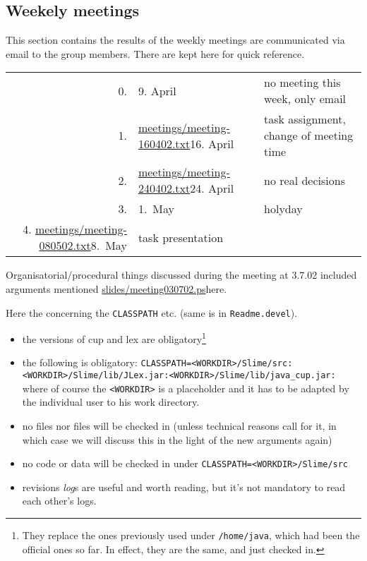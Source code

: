

\subsection*{Weekely meetings}
\label{sec:meetings}


This section contains the results of the weekly meetings are communicated
via email to the group members. There are kept here for quick reference.


\begin{center}
  \begin{tabular}[t]{r@{\quad}l@{\quad\quad}p{9cm}}
    0.
    &
    9. April
    &
    no meeting this week, only email
    \\
    1.
    &
    \url{meetings/meeting-160402.txt}{16. April}
    &
    task assignment, change of meeting time
    \\
    2.
    & 
    \url{meetings/meeting-240402.txt}{24. April}
    &
    no real decisions
    \\
    3.
    &
    1.\ May
    &
    holyday
    \\
    4.
    \url{meetings/meeting-080502.txt}{8.\ May}
    & 
    task presentation
    \\
  \end{tabular}
\end{center}



Organisatorial/procedural things discussed during the meeting at 3.7.02
included arguments mentioned \url{slides/meeting030702.ps}{here.}


Here the  concerning the \texttt{CLASSPATH}
etc. (same is in \texttt{Readme.devel}).

\begin{itemize}
\item the  versions of cup and lex are
  obligatory\footnote{They replace the ones previously used under
    \texttt{/home/java}, which had been the official ones so far. In
    effect, they are the same, and just checked in.}
\item the following  is obligatory:
  \texttt{CLASSPATH=<WORKDIR>/Slime/src:<WORKDIR>/Slime/lib/JLex.jar:<WORKDIR>/Slime/lib/java_cup.jar:}
  where of course the \texttt{<WORKDIR>} is a placeholder and it has to be
  adapted by the individual user to his work directory.
\item no  files nor  files will be
  checked in (unless technical reasons call for it, in which case we will
  discuss this in the light of the new arguments again)
\item no  code or data will be checked in under
  \texttt{CLASSPATH=<WORKDIR>/Slime/src}
\item revisions \emph{log}s are useful and worth reading, but it's not
  mandatory to read each other's logs.
\end{itemize}



